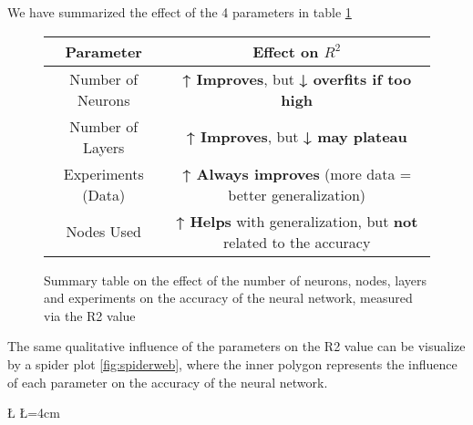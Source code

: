 We have summarized the effect of the 4 parameters in table \ref{table:summary_NN_params}

\begin{figure}
\centering

\begin{tabular}{|c|c|}
    \hline
    \textbf{Parameter} & \textbf{Effect on \( R^2 \)} \\ 
    \hline
    Number of Neurons & \textbf{↑ Improves}, but \textbf{↓ overfits if too high} \\ 
    \hline
    Number of Layers & \textbf{↑ Improves}, but \textbf{↓ may plateau} \\ 
    \hline
    Experiments (Data) & \textbf{↑ Always improves} (more data = better generalization) \\ 
    \hline
    Nodes Used & \textbf{↑ Helps} with generalization, but \textbf{not} related to the accuracy  \\ 
    \hline

\end{tabular}
  
  \caption{Summary table on the effect of the number of neurons, nodes, layers and experiments on the accuracy of the neural network, measured via the R2 value}
  \label{table:summary_NN_params}
\end{figure}


The same qualitative influence of the parameters on the R2 value can be visualize by a spider plot \ref{fig:spiderweb}, where the inner polygon represents the influence of each parameter on the accuracy of the neural network. 

\newcommand{\D}{4} %
\newcommand{\U}{4} %

\newdimen\R %
\R=3.5cm 
\newdimen\L %
\L=4cm

\newcommand{\A}{360/\D} %

